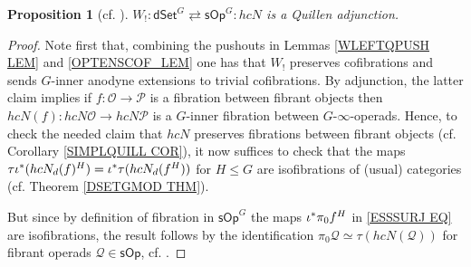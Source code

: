 \documentclass[a4paper,10pt
,draft
]{article}%
\numberwithin{equation}{section}
\numberwithin{figure}{section}
\newtheorem{proposition}[equation]{Proposition}%
\theoremstyle{definition} %
\newcommand{\sOp}{\ensuremath{\mathsf{sOp}}}%
\newcommand{\dSet}{\mathsf{dSet}}
\newcommand{\1}{\ensuremath{\mathbbm 1}}%
\begin{document}
\begin{proposition}[{cf. \cite[Prop. 4.9]{CM13b}}]
      \label{W!_LEFTQ_PROP}
      $W_!: \dSet^G \rightleftarrows \sOp^G\colon hcN$
      is a Quillen adjunction.
\end{proposition}

\begin{proof}
	Note first that, combining the pushouts in 
	Lemmas \ref{WLEFTQPUSH LEM}
	and \ref{OPTENSCOF_LEM}
	one has that 
	$W_!$ preserves cofibrations
	and sends $G$-inner anodyne extensions to trivial cofibrations.
	By adjunction,
	the latter claim implies 
	if $f\colon \mathcal{O} \to \mathcal{P}$ is a fibration between fibrant objects
	then 
	$hcN (f)\colon hcN \mathcal{O} \to hcN\mathcal{P}$
	is a $G$-inner fibration between $G$-$\infty$-operads.
	Hence, to check the needed claim that 
	$hcN$ preserves fibrations between fibrant objects
	(cf. Corollary \ref{SIMPLQUILL COR}),
	it now suffices to check that the maps
	$\tau \iota^{\**} (h c N_d(f)^H) = \iota^{\**} \tau (h c N_d(f^H))$
	for $H \leq G$
	are isofibrations of (usual) categories
	(cf. Theorem \ref{DSETGMOD THM}).
	
	But since by definition 
	of fibration in $\mathsf{sOp}^G$
	the maps $\iota^{\**} \pi_0 f^H$ in \eqref{ESSSURJ EQ}
	are isofibrations,
	the result follows by the identification
	$\pi_0 \mathcal{Q} \simeq 
	\tau \left(h c N (\mathcal{Q}) \right)$ for fibrant operads $\mathcal{Q} \in \mathsf{sOp}$,
	cf. \cite[Prop. 4.8]{CM13b}.
\end{proof}
\end{document}
